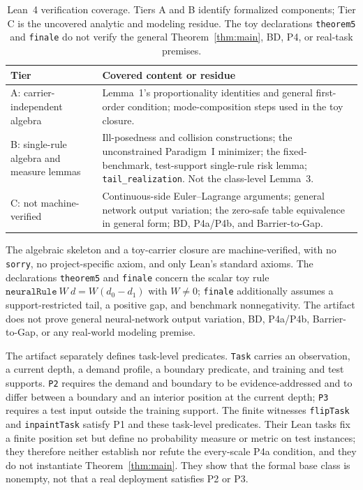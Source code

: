 \documentclass[twoside,11pt]{article}
\begin{document}
\begin{table}[t]
\caption{Lean~4 verification coverage. Tiers A and B identify formalized components; Tier C is the uncovered analytic and modeling residue. The toy declarations \texttt{theorem5} and \texttt{finale} do not verify the general Theorem~\ref{thm:main}, BD, P4, or real-task premises.}
\label{tab:verification-tiers}
\centering
\small
\begin{tabular}{@{}>{\raggedright\arraybackslash}p{}>{\raggedright\arraybackslash}p{}@{}}
\hline
\textbf{Tier} & \textbf{Covered content or residue}\\
\hline
A: carrier-independent algebra & Lemma~1's proportionality identities and general first-order condition; mode-composition steps used in the toy closure.\\
\hline
B: single-rule algebra and measure lemmas & Ill-posedness and collision constructions; the unconstrained Paradigm~I minimizer; the fixed-benchmark, test-support single-rule risk lemma; \texttt{tail\_realization}. Not the class-level Lemma~3.\\
\hline
C: not machine-verified & Continuous-side Euler--Lagrange arguments; general network output variation; the zero-safe table equivalence in general form; BD, P4a/P4b, and Barrier-to-Gap.\\
\hline
\end{tabular}
\end{table}

The algebraic skeleton and a toy-carrier closure are machine-verified, with no \texttt{sorry}, no project-specific axiom, and only Lean's standard axioms. The declarations \texttt{theorem5} and \texttt{finale} concern the scalar toy rule $\texttt{neuralRule}\ W\ d=W(d_0-d_1)$ with $W\neq0$; \texttt{finale} additionally assumes a support-restricted tail, a positive gap, and benchmark nonnegativity. The artifact does not prove general neural-network output variation, BD, P4a/P4b, Barrier-to-Gap, or any real-world modeling premise.

The artifact separately defines task-level predicates. \texttt{Task} carries an observation, a current depth, a demand profile, a boundary predicate, and training and test supports. \texttt{P2} requires the demand and boundary to be evidence-addressed and to differ between a boundary and an interior position at the current depth; \texttt{P3} requires a test input outside the training support. The finite witnesses \texttt{flipTask} and \texttt{inpaintTask} satisfy P1 and these task-level predicates. Their Lean tasks fix a finite position set but define no probability measure or metric on test instances; they therefore neither establish nor refute the every-scale P4a condition, and they do not instantiate Theorem~\ref{thm:main}. They show that the formal base class is nonempty, not that a real deployment satisfies P2 or P3.
\end{document}
